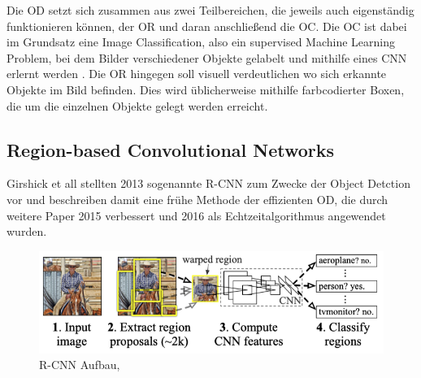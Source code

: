Die \ac{OD} setzt sich zusammen aus zwei Teilbereichen, die jeweils auch eigenständig funktionieren können, der \ac{OR} und daran anschließend die \ac{OC}. Die \ac{OC} ist dabei im Grundsatz eine Image Classification, also ein supervised Machine Learning Problem, bei dem Bilder verschiedener Objekte gelabelt und mithilfe eines \ac{CNN} erlernt werden \cite[S.615f.]{Manojkrishna.2018}. Die \ac{OR} hingegen soll visuell verdeutlichen wo sich erkannte Objekte im Bild befinden. Dies wird üblicherweise mithilfe farbcodierter Boxen, die um die einzelnen Objekte gelegt werden erreicht.

\subsection{Region-based Convolutional Networks}

Girshick et all stellten 2013 sogenannte \ac{R-CNN} zum Zwecke der Object Detction vor \cite{Girshick.2016} und beschreiben damit eine frühe Methode der effizienten \ac{OD}, die durch weitere Paper 2015 \cite{Girshick.30.04.2015} verbessert und 2016 \cite{Ren.04.06.2015} als Echtzeitalgorithmus angewendet wurden.

\begin{figure}[H]
    \centering
    \includegraphics[scale=0.5]{./img/rcnn.png}
    \caption{R-CNN Aufbau, \cite[S.2]{Girshick.2016}}
    \label{fig:rcnn}
\end{figure}

